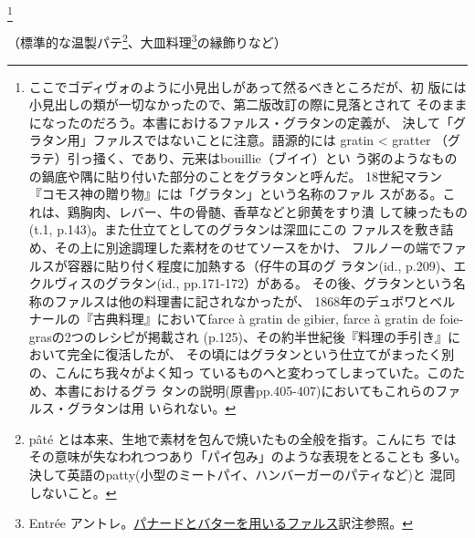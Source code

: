 \begin{recette}
\footnote{ここでゴディヴォのように小見出しがあって然るべきところだが、初
  版には小見出しの類が一切なかったので、第二版改訂の際に見落とされて
  そのままになったのだろう。本書におけるファルス・グラタンの定義が、
  決して「グラタン用」ファルスではないことに注意。語源的には gratin
  \textless{} gratter
  （グラテ）引っ掻く、であり、元来はbouillie（ブイイ）とい
  う粥のようなものの鍋底や隅に貼り付いた部分のことをグラタンと呼んだ。
  18世紀マラン『コモス神の贈り物』には「グラタン」という名称のファル
  スがある。これは、鶏胸肉、レバー、牛の骨髄、香草などと卵黄をすり潰
  して練ったもの(t.1, p.143)。また仕立てとしてのグラタンは深皿にこの
  ファルスを敷き詰め、その上に別途調理した素材をのせてソースをかけ、
  フルノーの端でファルスが容器に貼り付く程度に加熱する（仔牛の耳のグ
  ラタン(id., p.209)、エクルヴィスのグラタン(id., pp.171-172）がある。
  その後、グラタンという名称のファルスは他の料理書に記されなかったが、
  1868年のデュボワとベルナールの『古典料理』においてfarce à gratin de
  gibier, farce à gratin de foie-grasの2つのレシピが掲載され
  (p.125)、その約半世紀後『料理の手引き』において完全に復活したが、
  その頃にはグラタンという仕立てがまったく別の、こんにち我々がよく知っ
  ているものへと変わってしまっていた。このため、本書におけるグラ
  タンの説明(原書pp.405-407)においてもこれらのファルス・グラタンは用
  いられない。}


（標準的な温製パテ\footnote{pâté
  とは本来、生地で素材を包んで焼いたもの全般を指す。こんにち
  ではその意味が失なわれつつあり「パイ包み」のような表現をとることも
  多い。決して英語のpatty(小型のミートパイ、ハンバーガーのパティなど)と
  混同しないこと。}、大皿料理\footnote{Entrée
  アントレ。\protect\hyperlink{panade-a}{パナードとバターを用いるファルス}訳注参照。}の縁飾りなど）


\end{recette}
